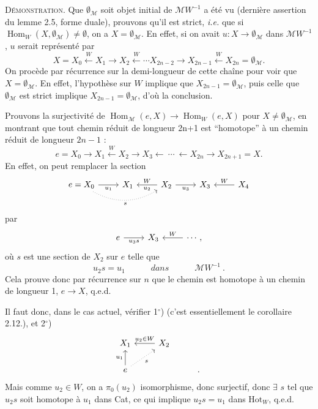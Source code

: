 \documentclass[11pt]{article}
\newcommand{\printedpage}[1]{\marginpar{\footnotesize p.~#1}}
\newcommand{\msp}[1]{\marginpar{\footnotesize [#1]}}
\newcommand{\Hom}{\operatorname{Hom}}
\newcommand{\Hot}{\mathrm{Hot}}
\begin{document}
\textsc{Démonstration}. Que $\emptyset_{\mathcal{M}}$ soit objet initial de $\mathcal{M}W^{-1}$ a été vu (dernière assertion du lemme 2.5, forme duale), prouvons qu'il est strict, \textit{i.e.} que si $\Hom_W(X,\emptyset_{\mathcal{M}})\neq\emptyset$, on a $X=\emptyset_{\mathcal{M}}$. En effet, si on avait $u : X\longrightarrow\emptyset_{\mathcal{M}}$ dans $\mathcal{M}W^{-1}$, $u$ serait représenté par
\[
X=X_0\xleftarrow{\ W\ }X_1\longrightarrow X_2\xleftarrow{\ W\ }\cdots X_{2n-2}\longrightarrow X_{2n-1}\xleftarrow{\ W\ }X_{2n}=\emptyset_{\mathcal{M}}.
\]
On procède par récurrence sur la demi-longueur de cette chaîne pour voir que $X=\emptyset_{\mathcal{M}}$. En effet, l'hypothèse sur $W$ implique que $X_{2n-1}=\emptyset_{\mathcal{M}}$, puis celle que $\emptyset_{\mathcal{M}}$ est strict implique
$X_{2n-1}=\emptyset_{\mathcal{M}}$, d'où la conclusion. %

\msp{14$'$}
Prouvons la surjectivité de $\Hom_{\mathcal{M}}(e,X)\longrightarrow\Hom_W(e,X)$ pour $X\neq\emptyset_{\mathcal{M}}$, en montrant que tout chemin réduit de longueur 2n+1 est “homotope” à un chemin réduit de longueur $2n-1$ :
\[
e=X_0\longrightarrow X_1\xleftarrow{\ W\ }X_2\longrightarrow X_3\longleftarrow\ \cdots\ \longleftarrow X_{2n}\longrightarrow X_{2n+1}=X.
\]
En effet, on peut remplacer la section
\[
\begin{tikzcd}
e=X_0 \arrow[r,"u_1"'] \arrow[rr,dotted,bend right,"s"'] & X_1 & X_2 \arrow[l,"W"',"u_2"] \arrow[r,"u_3"'] & X_3 & X_4 \arrow[l,"W"']
\end{tikzcd}
\]
\printedpage{11}
par
\[
\begin{tikzcd}
e \arrow[r,"u_3s"'] & X_3 & \cdots, \arrow[l,"W"']
\end{tikzcd}
\]
où $s$ est une section de $X_2$ sur $e$ telle que
\[
u_2s=u_1\qquad\quad\textit{dans}\qquad\quad\mathcal{M}W^{-1}\ .
\]
Cela prouve donc par récurrence sur $n$ que le chemin est homotope à un chemin de longueur 1, $e\longrightarrow X$, q.e.d.

Il faut donc, dans le cas actuel, vérifier 1$^{\circ}$) (c'est essentiellement le corollaire 2.12.), et 2$^{\circ}$)
\[
\begin{tikzcd}
X_1 & X_2 \arrow[l,"u_2\in W"'] & \\
e \arrow[u,"u_1"] \arrow[ur,dotted,"s"'] & & .
\end{tikzcd}
\]
Mais comme $u_2\in W$, on a $\pi_0(u_2)$ isomorphisme, donc
\msp{15$'$}
surjectif, donc $\exists$ $s$ tel que $u_2s$ soit homotope à $u_1$ dans Cat, ce qui implique $u_2s=u_1$ dans $\Hot_W$, q.e.d.
\end{document}

